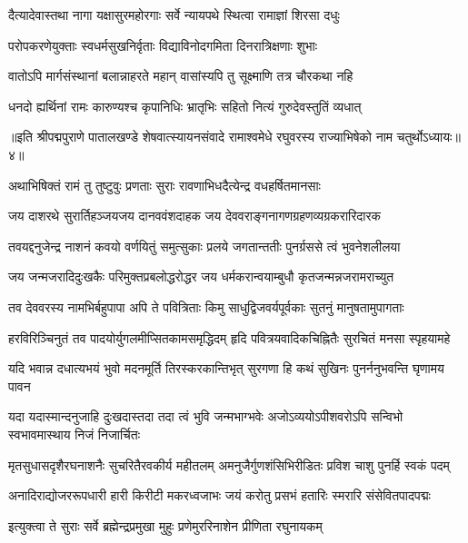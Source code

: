 \twolineshloka
{दैत्यादेवास्तथा नागा यक्षासुरमहोरगाः}
{सर्वे न्यायपथे स्थित्वा रामाज्ञां शिरसा दधुः}%

\twolineshloka
{परोपकरणेयुक्ताः स्वधर्मसुखनिर्वृताः}
{विद्याविनोदगमिता दिनरात्रिक्षणाः शुभाः}%

\twolineshloka
{वातोऽपि मार्गसंस्थानां बलान्नाहरते महान्}
{वासांस्यपि तु सूक्ष्माणि तत्र चौरकथा नहि}%

\twolineshloka
{धनदो ह्यर्थिनां रामः कारुण्यश्च कृपानिधिः}
{भ्रातृभिः सहितो नित्यं गुरुदेवस्तुतिं व्यधात्}%

{॥इति श्रीपद्मपुराणे पातालखण्डे शेषवात्स्यायनसंवादे रामाश्वमेधे रघुवरस्य राज्याभिषेको नाम चतुर्थोऽध्यायः॥४॥}

\resetShloka


\twolineshloka
{अथाभिषिक्तं रामं तु तुष्टुवुः प्रणताः सुराः}
{रावणाभिधदैत्येन्द्र वधहर्षितमानसाः}%


\twolineshloka
{जय दाशरथे सुरार्तिहञ्जयजय दानववंशदाहक}
{जय देववराङ्गनागणग्रहणव्यग्रकरारिदारक}%

\twolineshloka
{तवयद्दनुजेन्द्र नाशनं कवयो वर्णयितुं समुत्सुकाः}
{प्रलये जगतान्ततीः पुनर्ग्रससे त्वं भुवनेशलीलया}%

\twolineshloka
{जय जन्मजरादिदुःखकैः परिमुक्तप्रबलोद्धरोद्धर}
{जय धर्मकरान्वयाम्बुधौ कृतजन्मन्नजरामराच्युत}%

\twolineshloka
{तव देववरस्य नामभिर्बहुपापा अपि ते पवित्रिताः}
{किमु साधुद्विजवर्यपूर्वकाः सुतनुं मानुषतामुपागताः}%

\twolineshloka
{हरविरिञ्चिनुतं तव पादयोर्युगलमीप्सितकामसमृद्धिदम्}
{हृदि पवित्रयवादिकचिह्नितैः सुरचितं मनसा स्पृहयामहे}%

\twolineshloka
{यदि भवान्न दधात्यभयं भुवो मदनमूर्ति तिरस्करकान्तिभृत्}
{सुरगणा हि कथं सुखिनः पुनर्ननुभवन्ति घृणामय पावन}%

\twolineshloka
{यदा यदास्मान्दनुजाहि दुःखदास्तदा तदा त्वं भुवि जन्मभाग्भवेः}
{अजोऽव्ययोऽपीशवरोऽपि सन्विभो स्वभावमास्थाय निजं निजार्चितः}%

\twolineshloka
{मृतसुधासदृशैरघनाशनैः सुचरितैरवकीर्य महीतलम्}
{अमनुजैर्गुणशंसिभिरीडितः प्रविश चाशु पुनर्हि स्वकं पदम्}%

\twolineshloka
{अनादिराद्योजररूपधारी हारी किरीटी मकरध्वजाभः}
{जयं करोतु प्रसभं हतारिः स्मरारि संसेवितपादपद्मः}%

\twolineshloka
{इत्युक्त्वा ते सुराः सर्वे ब्रह्मेन्द्रप्रमुखा मुहुः}
{प्रणेमुररिनाशेन प्रीणिता रघुनायकम्}%


